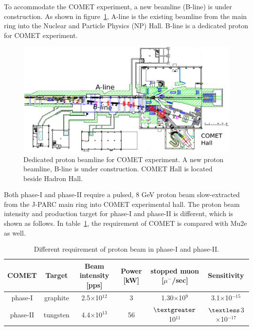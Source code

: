 To accommodate the COMET experiment, a new beamline (B-line) is under construction.
As shown in figure~\ref{bline}, A-line is the existing beamline from the main ring into the Nuclear and Particle Physics (NP) Hall.
B-line is a dedicated proton for COMET experiment.
\begin{figure}[H]
 \centering
 \includegraphics[scale=0.5]{chapter2/fig/beamline.pdf}
 \caption{Dedicated proton beamline for COMET experiment. A new proton beamline, B-line is under construction. COMET Hall is located beside Hadron Hall.}
 \label{bline}
\end{figure}
Both phase-I and phase-II require a pulsed, 8 GeV proton beam slow-extracted from the J-PARC main ring into COMET experimental hall.
The proton beam intensity and production target for phase-I and phase-II is different, which is shown as follows.
In table~\ref{intens}, the requirement of COMET is compared with Mu2e as well.
\begin{table}[H]
 \centering
 \begin{tabular}{cccccc} \hline \hline
  COMET & Target &  Beam intensity [pps] & Power [kW] & stopped muon [$\mu^-$/sec] & Sensitivity \\ \hline
  phase-I & graphite & 2.5$\times$10$^{12}$ & 3 & 1.30$\times$10$^9$ & 3.1$\times$10$^{-15}$ \\
  phase-II & tungsten & 4.4$\times$10$^{13}$ & 56 & $\textgreater$ 10$^{11}$ & $\textless$3$\times$10$^{-17}$ \\ \hline
 \end{tabular}
 \caption{Different requirement of proton beam in phase-I and phase-II.}
 \label{intens}
\end{table}


